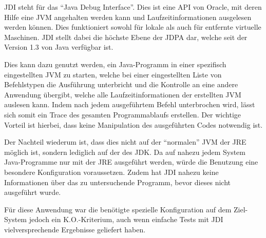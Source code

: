 \ac{JDI} steht für das "`Java Debug Interface"'. Dies ist eine \ac{API} von Oracle, mit deren Hilfe eine \ac{JVM} angehalten werden kann und Laufzeitinformationen ausgelesen werden können. Dies funktioniert sowohl für lokale als auch für entfernte virtuelle Maschinen. \ac{JDI} stellt dabei die höchste Ebene der \ac{JDPA} dar, welche seit der Version 1.3 von Java verfügbar ist.

Dies kann dazu genutzt werden, ein Java-Programm in einer spezifisch eingestellten \ac{JVM} zu starten, welche bei einer eingestellten Liste von Befehlstypen die Ausführung unterbricht und die Kontrolle an eine andere Anwendung übergibt, welche alle Laufzeitinformationen der erstellten \ac{JVM} auslesen kann. Indem nach jedem ausgeführtem Befehl unterbrochen wird, lässt sich somit ein Trace des gesamten Programmablaufs erstellen. Der wichtige Vorteil ist hierbei, dass keine Manipulation des ausgeführten Codes notwendig ist.

Der Nachteil wiederum ist, dass dies nicht auf der "`normalen"' \ac{JVM} der \ac{JRE} möglich ist, sondern lediglich auf der des \ac{JDK}. Da auf nahezu jedem System Java-Programme nur mit der \ac{JRE} ausgeführt werden, würde die Benutzung eine besondere Konfiguration voraussetzen. Zudem hat \ac{JDI} nahezu keine Informationen über das zu untersuchende Programm, bevor dieses nicht ausgeführt wurde.

Für diese Anwendung war die benötigte spezielle Konfiguration auf dem Ziel-System jedoch ein K.O.-Kriterium, auch wenn einfache Tests mit \ac{JDI} vielversprechende Ergebnisse geliefert haben.